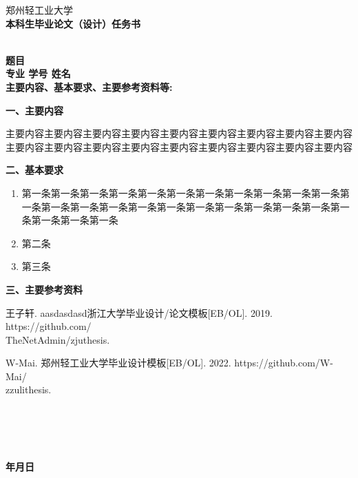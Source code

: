 \thispagestyle{empty}
\cleardoublepage{}
\coverstyle

{   
    \heiti
    \centering{}郑州轻工业大学 \\
    \bfseries 本科生毕业论文（设计）任务书 \\
    ~\\
}
{
    {
        \bfseries\noindent\heiti
        题目\uline{\hfill\Title\hfill} \\
        专业\uline{\hfill\Major\mbox{\Grade}\hfill}
        学号\uline{\hfill\StudentID\hfill}
        姓名\uline{\hfill\StudentName\hfill} \\
        主要内容、基本要求、主要参考资料等: 
        \vspace{1em}
    }
    {
        \newcommand{\temptitle}[1]{{\noindent{}\textbf{#1}}}

        \temptitle{一、主要内容}
        \par 主要内容主要内容主要内容主要内容主要内容主要内容主要内容主要内容主要内容主要内容主要内容主要内容主要内容主要内容主要内容主要内容主要内容主要内容
    
        \temptitle{二、基本要求}
        \begin{enumerate}[label={\arabic*)}, leftmargin=4em]
            \item 第一条第一条第一条第一条第一条第一条第一条第一条第一条第一条第一条第一条第一条第一条第一条第一条第一条第一条第一条第一条第一条第一条第一条第一条第一条第一条
            \item 第二条
            \item 第三条
        \end{enumerate}
        
        \temptitle{三、主要参考资料}
        \begin{enumerate}[label={[\arabic*]}, leftmargin=4em]
            \item 王子轩. aasdasdasd浙江大学毕业设计/论文模板[EB/OL]. 2019. https://github.com/\\TheNetAdmin/zjuthesis.
            \item W-Mai. 郑州轻工业大学毕业设计模板[EB/OL]. 2022. https://github.com/W-Mai/\\zzulithesis.
        \end{enumerate}
    }
    {
        ~\\
        \noindent
        \heiti\bfseries
        \makebox[2em]{}\makebox[15em][s]{\uline{\hfill\Deadline\hfill}} \\
        \makebox[2em]{}\makebox[15em][s]{\uline{\hfill~\hfill}} \\
        \makebox[2em]{}\makebox[15em][s]{\uline{\hfill~\hfill}} \\
        \makebox[8em]{}年\makebox[4em]{}月\makebox[4em]{}日
    }
}
